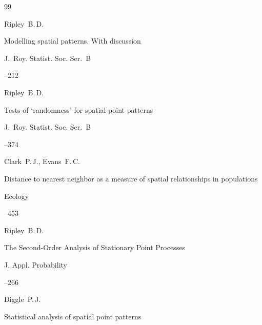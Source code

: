 \begin{thebibliography}{99}




\by Ripley~B.\,D.

\paper Modelling spatial patterns. With discussion




\jour J.~Roy. Statist. Soc. Ser.~B

--212




\by Ripley~B.\,D.

\paper Tests of `randomness' for spatial point patterns

\jour J.~Roy. Statist. Soc. Ser.~B


--374





\by Clark~P.\,J., Evans~F.\,C.

\paper Distance to nearest neighbor as a measure of spatial relationships in populations

\jour Ecology




--453




\by Ripley~B.\,D.

\paper The Second-Order Analysis of Stationary Point Processes 




\jour J. Appl. Pro\-ba\-bi\-li\-ty

--266






\by Diggle~P.\,J. 


\book Statistical analysis of spatial point patterns


\end{thebibliography}
